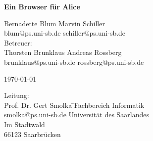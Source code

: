 \documentclass[12pt,a4paper]{article}
\begin{document}

\begin{titlepage}

\vspace*{\fill}
\begin{center}
\Huge{\bf{Ein Browser f\"ur Alice}}   
\end{center}

\vspace{1cm}

\begin{center}
  \begin{minipage}[center]{10cm}
    \begin{tabbing} 
      \large{Bernadette Blum} \hspace{1cm}\= \large{Marvin Schiller}\\
      blum@ps.uni-sb.de \> schiller@ps.uni-sb.de\\[1cm]

      Betreuer: \\[2mm]
      Thorsten Brunklaus \> Andreas Rossberg\\
      \small{brunklaus@ps.uni-sb.de} \> \small{rossberg@ps.uni-sb.de}

    \end{tabbing}
  \end{minipage}
\end{center}

\vspace{5mm}
\begin{center}
\large{\today}
\end{center}

\vspace{8mm}

\begin{center}
  \begin{minipage}[center]{15cm}
    \begin{tabbing}
     Leitung: \\
     Prof. Dr. Gert Smolka \hspace{1cm}\= \small Fachbereich Informatik \\ 
    \small{smolka@ps.uni-sb.de} \> \small Universit\"{a}t des Saarlandes\\ 
    \> \small Im Stadtwald \\
    \> \small  66123 Saarbr\"{u}cken \\[5mm]
    \end{tabbing}
  \end{minipage}
\end{center}

\vspace*{\fill}

\normalsize
\end{titlepage}
\end{document}
